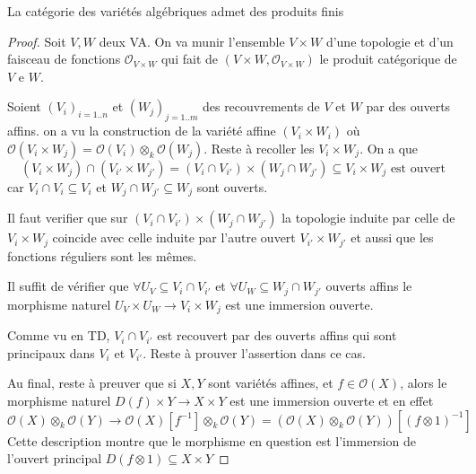 \begin{proposition}{}
    La catégorie des variétés algébriques admet des produits finis
\end{proposition}
\begin{proof}{}
    Soit \(V, W\) deux VA. On va munir l'ensemble \(V \times W\) d'une topologie
    et d'un faisceau de fonctions \(\mathcal{O}_{V \times  W} \) qui fait de
    \({(V \times  W, \mathcal{O}_{V \times  W} )}\) le produit catégorique de
    \(V\) e \(W\).

    Soient \({(V_{i})}_{i = 1. .n} \) et \({(W_{j})}_{j = 1. .m} \) des
    recouvrements de \(V\) et \(W\) par des ouverts affins. on a vu la
    construction de la variété affine \({(V_{i} \times  W_{i})}\) où
    \(\mathcal{O}{(V_{i} \times W_{j})} = \mathcal{O}{(V_{i})} \otimes_k
    \mathcal{O}{(W_{j})}\). Reste à recoller les \(V_{i} \times  W_{j}\). On a
    que
    \[
      {(V_{i}\times W_{j})} \cap {(V_{i'}\times W_{j'})} = {\left( V_{i} \cap
      V_{i'}  \right)} \times  {\left( W_{j} \cap W_{j'}  \right)} \subseteq
      V_{i} \times W_{j} \text{ est ouvert}
    \]
    car \(V_{i} \cap V_{i} \subseteq V_{i}  \) et \(W_{j} \cap W_{j'}
    \subseteq W_{j} \) sont ouverts.

    Il faut verifier que sur \({(V_{i} \cap V_{i'} )} \times {(W_{j} \cap W_{j'}
    )}\) la topologie induite par celle de \(V_{i} \times W_{j}\) coincide avec
    celle induite par l'autre ouvert \(V_{i'}  \times W_{j'} \) et aussi que les
    fonctions réguliers sont les mêmes.

    Il suffit de vérifier que \(\forall U_V \subseteq V_{i} \cap V_{i'}  \) et
    \(\forall U_W \subseteq W_j \cap W_{j'}  \) ouverts affins le morphisme
    naturel \(U_V \times  U_W \to V_{i} \times  W_j\) est une immersion ouverte.

    Comme vu en TD, \(V_{i} \cap V_{i'} \) est recouvert par des ouverts affins
    qui sont principaux dans \(V_{i}\) et \(V_{i'}\). Reste à prouver
    l'assertion dans ce cas.

    Au final, reste à preuver que si \(X, Y\) sont variétés affines, et \(f \in
    \mathcal{O}{(X)}\), alors le morphisme naturel \(D{(f)} \times  Y \to X
    \times Y\) est une immersion ouverte et en effet
    \[
        \mathcal{O}{(X)} \otimes_k \mathcal{O}{(Y)} \to \mathcal{O}{(X)}[f^{-1}]
        \otimes_k \mathcal{O}{(Y)} = {\left( \mathcal{O}{(X)} \otimes_k
        \mathcal{O}{(Y)}\right)}\left[ {(f \otimes 1)}^{-1} \right] 
    \]
    Cette description montre que le morphisme en question est l'immersion de
    l'ouvert principal \(D{(f \otimes 1)} \subseteq X \times Y \) 
\end{proof}

